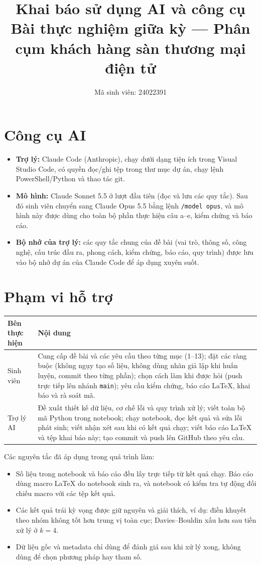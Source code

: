 \documentclass[11pt,a4paper]{article}
\title{Khai báo sử dụng AI và công cụ\\
\large Bài thực nghiệm giữa kỳ — Phân cụm khách hàng sàn thương mại điện tử}
\author{Mã sinh viên: 24022391}
\date{}
\begin{document}
\maketitle

\section{Công cụ AI}

\begin{itemize}
  \item \textbf{Trợ lý:} Claude Code (Anthropic), chạy dưới dạng tiện ích trong Visual Studio Code, có quyền đọc/ghi tệp trong thư mục dự án, chạy lệnh PowerShell/Python và thao tác git.
  \item \textbf{Mô hình:} Claude Sonnet 5.5 ở lượt đầu tiên (đọc và lưu các quy tắc). Sau đó sinh viên chuyển sang Claude Opus 5.5 bằng lệnh \texttt{/model opus}, và mô hình này được dùng cho toàn bộ phần thực hiện câu a–e, kiểm chứng và báo cáo.
  \item \textbf{Bộ nhớ của trợ lý:} các quy tắc chung của đề bài (vai trò, thông số, công nghệ, cấu trúc đầu ra, phong cách, kiểm chứng, báo cáo, quy trình) được lưu vào bộ nhớ dự án của Claude Code để áp dụng xuyên suốt.
\end{itemize}

\section{Phạm vi hỗ trợ}

\begin{longtable}{P{0.3\textwidth}P{0.64\textwidth}}
\toprule
\textbf{Bên thực hiện} & \textbf{Nội dung} \\
\midrule
\endhead
Sinh viên &
Cung cấp đề bài và các yêu cầu theo từng mục (1–13); đặt các ràng buộc (không ngụy tạo số liệu, không dùng nhãn giả lập khi huấn luyện, commit theo từng phần); chọn cách làm khi được hỏi (push trực tiếp lên nhánh \texttt{main}); yêu cầu kiểm chứng, báo cáo LaTeX, khai báo và rà soát mã. \\
\addlinespace
Trợ lý AI &
Đề xuất thiết kế dữ liệu, cơ chế lỗi và quy trình xử lý; viết toàn bộ mã Python trong notebook; chạy notebook, đọc kết quả và sửa lỗi phát sinh; viết nhận xét sau khi có kết quả chạy; viết báo cáo LaTeX và tệp khai báo này; tạo commit và push lên GitHub theo yêu cầu. \\
\bottomrule
\end{longtable}

Các nguyên tắc đã áp dụng trong quá trình làm:
\begin{itemize}
  \item Số liệu trong notebook và báo cáo đều lấy trực tiếp từ kết quả chạy. Báo cáo dùng macro LaTeX do notebook sinh ra, và notebook có kiểm tra tự động đối chiếu macro với các tệp kết quả.
  \item Các kết quả trái kỳ vọng được giữ nguyên và giải thích, ví dụ: điền khuyết theo nhóm không tốt hơn trung vị toàn cục; Davies–Bouldin xấu hơn sau tiền xử lý ở $k=4$.
  \item Dữ liệu gốc và metadata chỉ dùng để đánh giá sau khi xử lý xong, không dùng để chọn phương pháp hay tham số.
\end{itemize}
\end{document}
